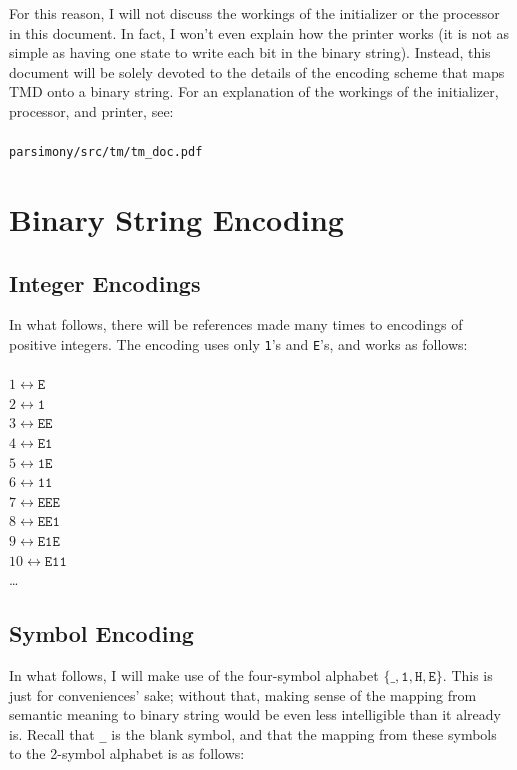 \documentclass[11pt]{article}
\begin{document}
For this reason, I will not discuss the workings of the initializer or the processor in this document. In fact, I won't even explain how the printer works (it is not as simple as having one state to write each bit in the binary string). Instead, this document will be solely devoted to the details of the encoding scheme that maps TMD onto a binary string. For an explanation of the workings of the initializer, processor, and printer, see: \\ \\
\texttt{parsimony/src/tm/tm_doc.pdf}

\section{Binary String Encoding}

\subsection{Integer Encodings}

In what follows, there will be references made many times to encodings of positive integers. The encoding uses only \texttt{1}'s and \texttt{E}'s, and works as follows: \\ \\
$1 \leftrightarrow \texttt{E}$ \\
$2 \leftrightarrow \texttt{1}$ \\
$3 \leftrightarrow \texttt{EE}$ \\
$4 \leftrightarrow \texttt{E1}$ \\
$5 \leftrightarrow \texttt{1E}$ \\
$6 \leftrightarrow \texttt{11}$ \\
$7 \leftrightarrow \texttt{EEE}$ \\
$8 \leftrightarrow \texttt{EE1}$ \\
$9 \leftrightarrow \texttt{E1E}$ \\
$10 \leftrightarrow \texttt{E11}$ \\
\dots

\subsection{Symbol Encoding}

In what follows, I will make use of the four-symbol alphabet $\{\texttt{_}, \texttt{1}, \texttt{H}, \texttt{E}\}$. This is just for conveniences' sake; without that, making sense of the mapping from semantic meaning to binary string would be even less intelligible than it already is. Recall that \texttt{_} is the blank symbol, and that the mapping from these symbols to the 2-symbol alphabet is as follows:
\end{document}
